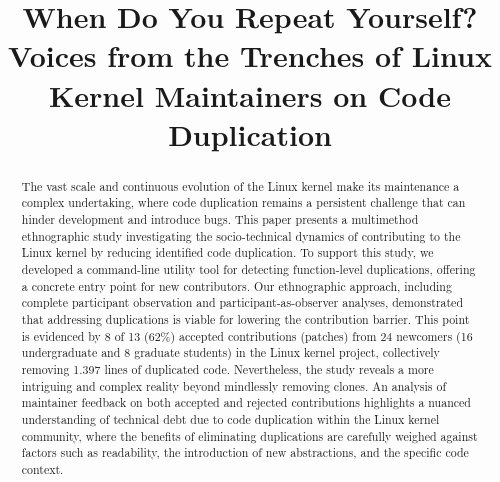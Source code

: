 \documentclass[10pt,conference]{IEEEtran}
\begin{document}
\title{When Do You Repeat Yourself?\\
Voices from the Trenches of Linux Kernel Maintainers on Code Duplication}



\author{}


\maketitle

\begin{abstract}
The vast scale and continuous evolution of the Linux kernel make its maintenance a complex undertaking, where code duplication remains a persistent challenge that can hinder development and introduce bugs.
%
This paper presents a multimethod ethnographic study investigating the socio-technical dynamics of contributing to the Linux kernel by reducing identified code duplication.
%
To support this study, we developed a command-line utility tool for detecting function-level duplications, offering a concrete entry point for new contributors.
%
Our ethnographic approach, including complete participant observation and participant-as-observer analyses, demonstrated that addressing duplications is viable for lowering the contribution barrier. This point is evidenced by 8 of 13 (62\%) accepted contributions (patches) from 24 newcomers (16 undergraduate and 8 graduate students) in the Linux kernel project, collectively removing 1.397 lines of duplicated code.
%
Nevertheless, the study reveals a more intriguing and complex reality beyond mindlessly removing clones. An analysis of maintainer feedback on both accepted and rejected contributions highlights a nuanced understanding of technical debt due to code duplication within the Linux kernel community, where the benefits of eliminating duplications are carefully weighed against factors such as readability, the introduction of new abstractions, and the specific code context.
\end{abstract}
\end{document}
